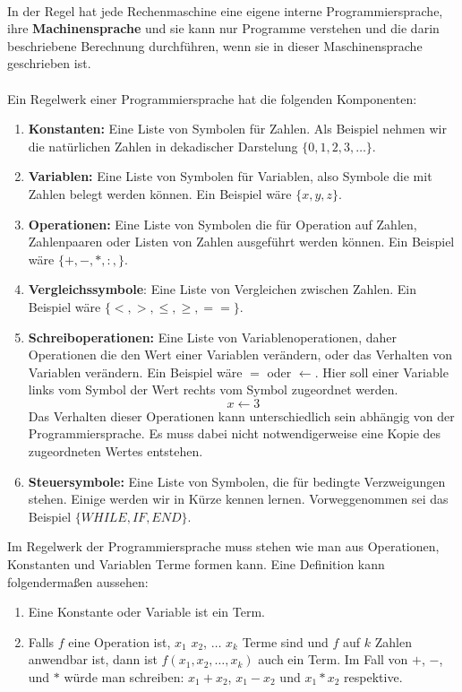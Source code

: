 \documentclass[11pt,a4paper,leqno]{report}
\numberwithin{equation}{chapter}
\begin{document}
\\
In der Regel hat jede Rechenmaschine eine eigene interne Programmiersprache, ihre \textbf{Machinensprache} und sie kann nur Programme verstehen und die darin beschriebene Berechnung durchf\"uhren, wenn sie in dieser Maschinensprache geschrieben ist.
\\
\\
Ein Regelwerk einer Programmiersprache hat die folgenden Komponenten:
\begin{enumerate}
	\item \textbf{Konstanten:} Eine Liste von Symbolen f\"ur Zahlen. Als Beispiel nehmen wir die nat\"urlichen Zahlen in dekadischer Darstelung $\{0,1,2,3,\dots\}$.
	\item \textbf{Variablen:} Eine Liste von Symbolen f\"ur Variablen, also Symbole die mit Zahlen belegt werden k\"onnen. Ein Beispiel w\"are $\{x, y, z\}$.
	\item \textbf{Operationen:} Eine Liste von Symbolen die f\"ur Operation auf Zahlen, Zahlenpaaren oder Listen von Zahlen ausgef\"uhrt werden k\"onnen. Ein Beispiel w\"are $\{+, -, *, :,\}$. 
	\item \textbf{Vergleichssymbole}: Eine Liste von Vergleichen zwischen Zahlen. Ein Beispiel w\"are $\{<, >,\leq,\geq,==\}$.
	\item \textbf{Schreiboperationen:} Eine Liste von Variablenoperationen, daher Operationen die den Wert einer Variablen ver\"andern, oder das Verhalten von Variablen ver\"andern. Ein Beispiel w\"are $=$ oder $\leftarrow$. Hier soll einer Variable links vom Symbol der Wert rechts vom Symbol zugeordnet werden. 
	$$x \leftarrow 3$$
	Das Verhalten dieser Operationen kann unterschiedlich sein abh\"angig von der Programmiersprache. Es muss dabei nicht notwendigerweise eine Kopie des zugeordneten Wertes entstehen. 
	\item \textbf{Steuersymbole:} Eine Liste von Symbolen, die f\"ur bedingte Verzweigungen stehen. Einige werden wir in K\"urze kennen lernen. Vorweggenommen sei das Beispiel $\{WHILE, IF, END\}$.
\end{enumerate}
\noindent
Im Regelwerk der Programmiersprache muss stehen wie man aus Operationen, Konstanten und Variablen Terme formen kann. Eine Definition kann folgenderma\ss{}en aussehen:
\begin{enumerate}
	\item Eine Konstante oder Variable ist ein Term.
	\item Falls $f$ eine Operation ist, $x_1$ $x_2$, $\dots$ $x_k$ Terme sind und $f$ auf $k$ Zahlen anwendbar ist, dann ist $f(x_1,x_2,\dots,x_k)$ auch ein Term. Im Fall von $+$, $-$, und $*$ w\"urde man schreiben: $x_1+x_2$, $x_1-x_2$ und $x_1 * x_2$ respektive.
\end{enumerate}
\end{document}
